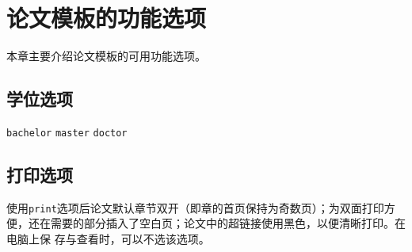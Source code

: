 

\chapter{\XeLaTeX{}论文模板的功能选项}
\label{cha:options}

本章主要介绍论文模板的可用功能选项。

\section{学位选项}
\label{sec:degree}

\texttt{bachelor}
\texttt{master}
\texttt{doctor}

\section{打印选项}
\label{sec:print}

使用\texttt{print}选项后论文默认章节双开（即章的首页保持为奇数页）；为双面打印方
便，还在需要的部分插入了空白页；论文中的超链接使用黑色，以便清晰打印。在电脑上保
存与查看时，可以不选该选项。


